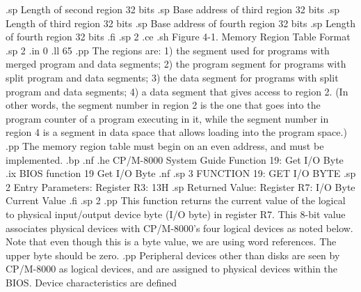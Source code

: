 .sp
            Length of second region          32 bits
.sp
            Base address of third region     32 bits
.sp
            Length of third region           32 bits
.sp
            Base address of fourth region    32 bits
.sp
            Length of fourth region          32 bits
.fi
.sp 2
.ce
.sh
Figure 4-1.  Memory Region Table Format
.sp 2
.in 0
.ll 65
.pp
The regions are:  1) the segment used for programs with merged program
and data segments;  2) the program segment for programs with split
program and data segments;  3) the data segment for programs with split
program and data segments;  4) a data segment that gives access to 
region 2.  (In other words, the segment number in region 2 is the
one that goes into the program counter of a program executing in it,
while the segment number in region 4 is a segment in data space
that allows loading into the program space.)
.pp
The memory region table must begin on an even address, and must be implemented.
.bp
.nf
.he CP/M-8000 System Guide                  Function 19:  Get I/O Byte
.ix BIOS function 19 Get I/O Byte
.nf
.sp 3
                   FUNCTION 19:  GET I/O BYTE
.sp 2 
               Entry Parameters:    
                  Register R3: 13H
.sp
               Returned   Value:  
                  Register R7: I/O Byte Current 
                                 Value
.fi
.sp 2
.pp
This function returns the current value of the logical to physical
input/output device byte (I/O byte) in register R7.  This 8-bit
value associates physical devices with CP/M-8000's four logical devices
as noted below.  Note that even though this is a byte value, we are
using word references.  The upper byte should be zero.
.pp
Peripheral devices other than
disks are seen by CP/M-8000 as logical devices, and are assigned to
physical devices within the BIOS.  Device characteristics are defined

